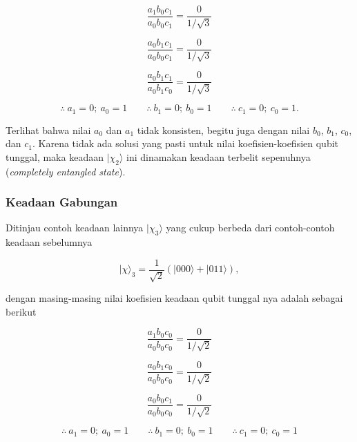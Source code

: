 \begin{equation}
\frac{a_1 b_0 c_1}{a_0 b_0 c_1}
=
\frac{0}{1/\sqrt{3}}
\end{equation}

\begin{equation}
\frac{a_0 b_1 c_1}{a_0 b_0 c_1}
=
\frac{0}{1/\sqrt{3}}
\end{equation}

\begin{equation}
\frac{a_0 b_1 c_1}{a_0 b_1 c_0}
=
\frac{0}{1/\sqrt{3}}
\end{equation}

\[
\therefore \ a_1 = 0 ; \ a_0 = 1
\qquad
\therefore \ b_1 = 0 ; \ b_0 = 1
\qquad
\therefore \ c_1 = 0 ; \ c_0 = 1 .
\]

Terlihat bahwa nilai $a_0$ dan $a_1$ tidak konsisten, begitu juga dengan nilai $b_0$, $b_1$, $c_0$, dan $c_1$. Karena tidak ada solusi yang pasti untuk nilai koefisien-koefisien qubit tunggal, maka keadaan $|\chi_2\rangle$ ini dinamakan keadaan terbelit sepenuhnya (\textit{completely entangled state}).

\subsubsection{Keadaan Gabungan}

Ditinjau contoh keadaan lainnya $|\chi_3\rangle$ yang cukup berbeda dari contoh-contoh keadaan sebelumnya

\begin{equation}
|\chi\rangle_3 =
\frac{1}{\sqrt{2}}
\left(
|000\rangle + |011\rangle
\right) ,
\end{equation}

dengan masing-masing nilai koefisien keadaan qubit tunggal nya adalah sebagai berikut

\begin{equation}
\frac{a_1 b_0 c_0}{a_0 b_0 c_0}
=
\frac{0}{1/\sqrt{2}}
\end{equation}

\begin{equation}
\frac{a_0 b_1 c_0}{a_0 b_0 c_0}
=
\frac{0}{1/\sqrt{2}}
\end{equation}

\begin{equation}
\frac{a_0 b_0 c_1}{a_0 b_0 c_0}
=
\frac{0}{1/\sqrt{2}}
\end{equation}

\[
\therefore \ a_1 = 0 ; \ a_0 = 1
\qquad
\therefore \ b_1 = 0 ; \ b_0 = 1
\qquad
\therefore \ c_1 = 0 ; \ c_0 = 1
\]

